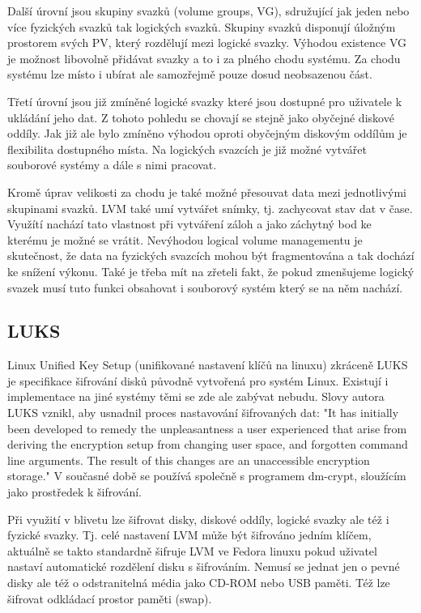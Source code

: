 \documentclass[color,table,oneside,nolot,nolof]{fithesis}
\begin{document}
	Další úrovní jsou skupiny svazků (volume groups, VG), sdružující jak jeden nebo více fyzických svazků tak logických svazků. Skupiny svazků disponují úložným prostorem svých PV, 
	který rozdělují mezi logické svazky. Výhodou existence VG je možnost libovolně přidávat svazky a to i za plného chodu systému. Za chodu systému lze místo i ubírat ale samozřejmě
	pouze dosud neobsazenou část. 

	Třetí úrovní jsou již zmíněné logické svazky které jsou dostupné pro uživatele k ukládání jeho dat. Z tohoto pohledu se chovají se stejně jako obyčejné diskové oddíly. Jak již ale
	bylo zmíněno výhodou oproti obyčejným diskovým oddílům je flexibilita dostupného místa. Na logických svazcích je již možné vytvářet souborové systémy a dále s nimi pracovat.

	Kromě úprav velikosti za chodu je také možné přesouvat data mezi jednotlivými skupinami svazků. LVM také umí vytvářet snímky, tj. zachycovat stav dat v čase. Využítí nachází tato 
	vlastnost
	při vytváření záloh a jako záchytný bod ke kterému je možné se vrátit. Nevýhodou logical volume managementu je skutečnost, že data na fyzických svazcích mohou být fragmentována a tak
	dochází ke snížení výkonu. Také je třeba mít na zřeteli fakt, že pokud zmenšujeme logický svazek musí tuto funkci obsahovat i souborový systém který se na něm nachází.

\subsection{LUKS}
	Linux Unified Key Setup (unifikované nastavení klíčů na linuxu) zkráceně LUKS je specifikace šifrování disků původně vytvořená pro systém Linux. Existují i implementace na jiné 
	systémy
	těmi se zde ale zabývat nebudu. Slovy autora LUKS vznikl, aby usnadnil proces nastavování šifrovaných dat: "It has initially been developed to remedy the unpleasantness a user 
	experienced that arise from deriving the encryption setup from changing user space, and forgotten command line arguments. The result of this changes are an unaccessible encryption
	storage."\cite{on-disk-format} V současné době se používá společně s programem dm-crypt, sloužícím jako prostředek k šifrování.

	Při využití v blivetu lze šifrovat disky, diskové oddíly, logické svazky ale též i fyzické svazky. Tj. celé nastavení LVM může být šifrováno jedním klíčem, aktuálně se takto 
	standardně šifruje LVM ve Fedora linuxu pokud uživatel nastaví automatické rozdělení disku s šifrováním. Nemusí se jednat jen o pevné disky ale též o odstranitelná média jako
	CD-ROM nebo USB paměti. Též lze šifrovat odkládací prostor paměti (swap).
\end{document}
